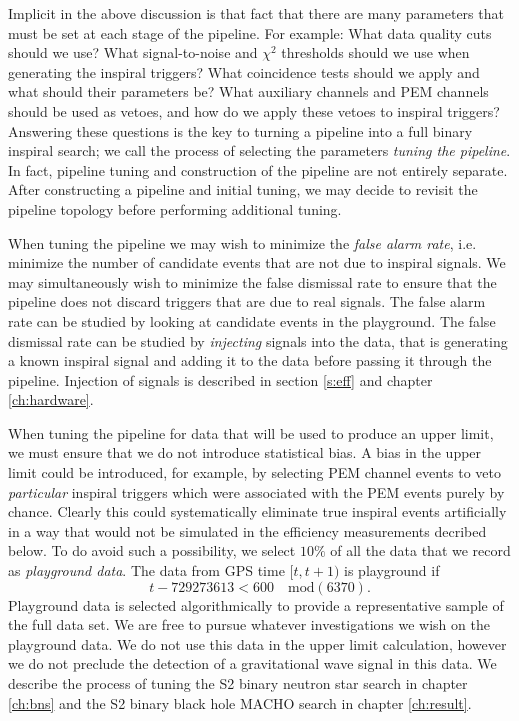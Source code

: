 Implicit in the above discussion is that fact that there are many parameters
that must be set at each stage of the pipeline. For example: What data quality
cuts should we use? What signal-to-noise and $\chi^2$ thresholds should we use
when generating the inspiral triggers? What coincidence tests should we apply
and what should their parameters be? What auxiliary channels and PEM channels
should be used as vetoes, and how do we apply these vetoes to inspiral
triggers? Answering these questions is the key to turning a pipeline into a
full binary inspiral search; we call the process of selecting the parameters
\emph{tuning the pipeline}. In fact, pipeline tuning and construction of the
pipeline are not entirely separate. After constructing a pipeline and initial
tuning, we may decide to revisit the pipeline topology before performing
additional tuning.

When tuning the pipeline we may wish to minimize the \emph{false alarm rate},
i.e. minimize the number of candidate events that are not due to inspiral
signals.  We may simultaneously wish to minimize the false dismissal rate to
ensure that the pipeline does not discard triggers that are due to real
signals.  The false alarm rate can be studied by looking at candidate events
in the playground. The false dismissal rate can be studied by \emph{injecting}
signals into the data, that is generating a known inspiral signal and adding
it to the data before passing it through the pipeline.  Injection of signals
is described in section \ref{s:eff} and chapter \ref{ch:hardware}.

When tuning the pipeline for data that will be used to produce an upper limit,
we must ensure that we do not introduce statistical bias. A bias in the upper
limit could be introduced, for example, by selecting PEM channel events to
veto \emph{particular} inspiral triggers which were associated with the  PEM
events purely by chance. Clearly this could systematically eliminate true
inspiral events artificially in a way that would not be simulated in the
efficiency measurements decribed below. To do avoid such a possibility, we
select $10\%$ of all the data that we record as \emph{playground data}. The
data from GPS time $[t,t+1)$ is playground if 
\begin{equation}
t - 729273613 < 600 \quad \mathrm{mod}(6370).
\end{equation}
Playground data is selected algorithmically to provide a representative sample
of the full data set. We are free to pursue whatever investigations we
wish on the playground data. We do not use this data in the upper limit
calculation, however we do not preclude the detection of a gravitational wave
signal in this data. We describe the process of tuning the S2 binary neutron
star search in chapter \ref{ch:bns} and the S2 binary black hole MACHO search
in chapter \ref{ch:result}.

